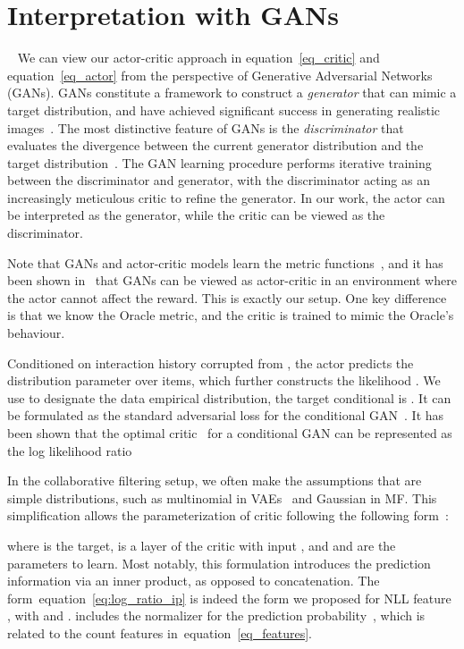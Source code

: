 \documentclass{article} \usepackage{iclr2020_conference,times}
\def\eqref#1{equation~\ref{#1}}
\begin{document}
\section{Interpretation with GANs}~\label{sec:gan}
We can view our actor-critic approach in \eqref{eq_critic} and \eqref{eq_actor} from the perspective of Generative Adversarial Networks (GANs). GANs constitute a framework to construct a {\it generator}  that can mimic a target distribution, and have achieved significant success in generating realistic images~\citep{goodfellow2014generative,radford2015unsupervised,karras2017progressive,brock2018large}. The most distinctive feature
of GANs is the {\it discriminator}  that evaluates the divergence between the current generator distribution and the target distribution~\citep{goodfellow2014generative,li2017alice}. The GAN learning procedure performs iterative training between the discriminator and generator, with the discriminator acting as an increasingly meticulous critic to refine the generator. In our work, the actor can be interpreted as the generator, while the critic can be viewed as the discriminator. 

Note that GANs and actor-critic models learn the metric functions~\citep{finn2016connection}, and it has been shown in~\citet{pfau2016connecting} that GANs can be viewed as actor-critic in an environment where the actor cannot affect the reward. This is exactly our setup. 
One key difference is that we know the Oracle metric, and the critic is trained to mimic the Oracle's behaviour. 


Conditioned on interaction history  corrupted from , the actor predicts the distribution parameter  over items, which further constructs the likelihood . We use  to designate the data empirical distribution, the target conditional is . It can be formulated as the standard adversarial loss for the conditional GAN~\citep{mirza2014conditional}. 
It has been shown that the optimal critic~\citep{goodfellow2014generative,li2017alice} for a conditional GAN can be represented as the log likelihood ratio

In the collaborative filtering setup, we often make the assumptions that  are simple distributions, such as multinomial in VAEs~\citep{liang2018variational} and Gaussian in MF. This simplification allows the parameterization of critic following the following form~\citep{miyato2018cgans}:

where  is the target,  is a layer of the critic with input , and  and  are the parameters to learn.  Most notably, this formulation introduces the prediction information via an inner product, as opposed to concatenation. The form~\eqref{eq:log_ratio_ip} is indeed the form we proposed for NLL feature , with  and .  includes the normalizer for the prediction probability~\citep{miyato2018cgans}, which is related to the count features in~\eqref{eq_features}.
\end{document}
